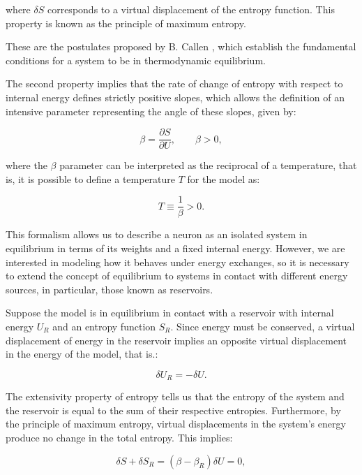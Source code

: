\documentclass[12pt]{article}
\begin{document}
where $\delta S$ corresponds to a virtual displacement of the entropy function. This property is known as the principle of maximum entropy.

These are the postulates proposed by B. Callen \cite{callen1985thermodynamics}, which establish the fundamental conditions for a system to be in thermodynamic equilibrium.

The second property implies that the rate of change of entropy with respect to internal energy defines strictly positive slopes, which allows the definition of an intensive parameter representing the angle of these slopes, given by:

\begin{equation}
\beta = \frac{\partial S}{\partial U}, \qquad \beta > 0,
\end{equation}

where the $\beta$ parameter can be interpreted as the reciprocal of a temperature, that is, it is possible to define a temperature $T$ for the model as:

\begin{equation}
T \equiv \frac{1}{\beta} > 0.
\end{equation}

This formalism allows us to describe a neuron as an isolated system in equilibrium in terms of its weights and a fixed internal energy. However, we are interested in modeling how it behaves under energy exchanges, so it is necessary to extend the concept of equilibrium to systems in contact with different energy sources, in particular, those known as reservoirs.

Suppose the model is in equilibrium in contact with a reservoir with internal energy $U_R$ and an entropy function $S_R$. Since energy must be conserved, a virtual displacement of energy in the reservoir implies an opposite virtual displacement in the energy of the model, that is.:

\begin{equation}
\delta U_R = -\delta U.
\end{equation}

The extensivity property of entropy tells us that the entropy of the system and the reservoir is equal to the sum of their respective entropies. Furthermore, by the principle of maximum entropy, virtual displacements in the system’s energy produce no change in the total entropy. This implies:

\begin{equation}
\delta S + \delta S_R = (\beta-\beta_R) \delta U = 0,
\end{equation}
\end{document}
